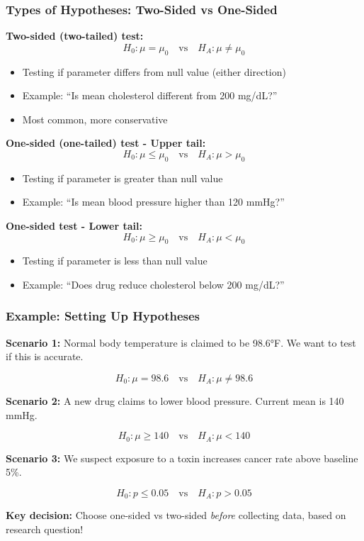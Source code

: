 \documentclass{beamer}
\begin{document}
\begin{frame}
\frametitle{Types of Hypotheses: Two-Sided vs One-Sided}
\textbf{Two-sided (two-tailed) test:}
$$H_0: \mu = \mu_0 \quad \text{vs} \quad H_A: \mu \neq \mu_0$$

\begin{itemize}
\item Testing if parameter differs from null value (either direction)
\item Example: ``Is mean cholesterol different from 200 mg/dL?''
\item Most common, more conservative
\end{itemize}

\vspace{0.2cm}
\textbf{One-sided (one-tailed) test - Upper tail:}
$$H_0: \mu \leq \mu_0 \quad \text{vs} \quad H_A: \mu > \mu_0$$

\begin{itemize}
\item Testing if parameter is greater than null value
\item Example: ``Is mean blood pressure higher than 120 mmHg?''
\end{itemize}

\vspace{0.2cm}
\textbf{One-sided test - Lower tail:}
$$H_0: \mu \geq \mu_0 \quad \text{vs} \quad H_A: \mu < \mu_0$$

\begin{itemize}
\item Testing if parameter is less than null value
\item Example: ``Does drug reduce cholesterol below 200 mg/dL?''
\end{itemize}
\end{frame}

\begin{frame}
\frametitle{Example: Setting Up Hypotheses}
\textbf{Scenario 1:} Normal body temperature is claimed to be 98.6°F. We want to test if this is accurate.

\vspace{0.15cm}
$$H_0: \mu = 98.6 \quad \text{vs} \quad H_A: \mu \neq 98.6$$

\vspace{0.1cm}
\textbf{Scenario 2:} A new drug claims to lower blood pressure. Current mean is 140 mmHg.

\vspace{0.15cm}
$$H_0: \mu \geq 140 \quad \text{vs} \quad H_A: \mu < 140$$

\vspace{0.1cm}
\textbf{Scenario 3:} We suspect exposure to a toxin increases cancer rate above baseline 5\%.

\vspace{0.15cm}
$$H_0: p \leq 0.05 \quad \text{vs} \quad H_A: p > 0.05$$

\vspace{0.1cm}
\textbf{Key decision:} Choose one-sided vs two-sided \textit{before} collecting data, based on research question!
\end{frame}
\end{document}
